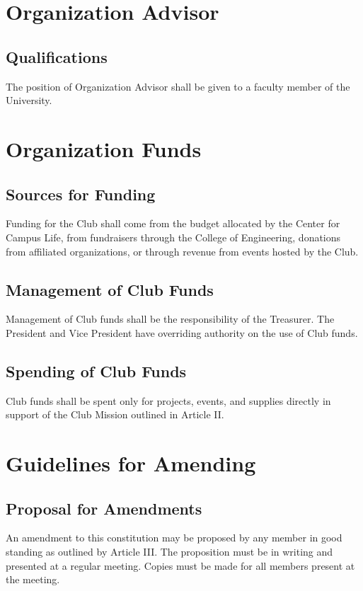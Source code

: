 \documentclass[english,11pt]{article}
\begin{document}
\section{Organization Advisor}

\subsection{Qualifications}
The position of Organization Advisor shall be given to a faculty member of the University.

\section{Organization Funds}

\subsection{Sources for Funding}
Funding for the Club shall come from the budget allocated by the Center for Campus Life, from fundraisers through the College of Engineering, donations from affiliated organizations, or through revenue from events hosted by the Club.

\subsection{Management of Club Funds}
Management of Club funds shall be the responsibility of the Treasurer.
The President and Vice President have overriding authority on the use of Club funds.

\subsection{Spending of Club Funds}
Club funds shall be spent only for projects, events, and supplies directly in support of the Club Mission outlined in Article II.

\section{Guidelines for Amending}

\subsection{Proposal for Amendments}
An amendment to this constitution may be proposed by any member in good standing as outlined by Article III.
The proposition must be in writing and presented at a regular meeting.
Copies must be made for all members present at the meeting.
\end{document}
